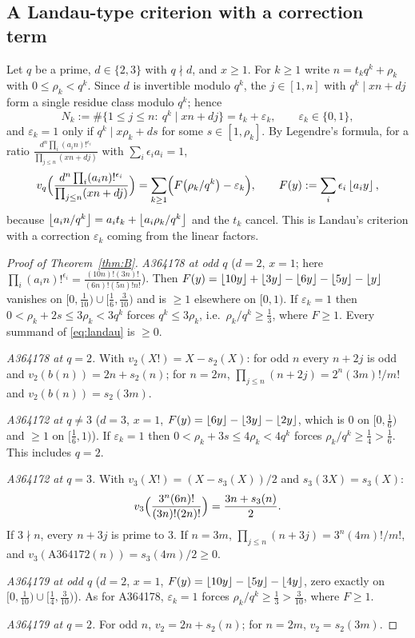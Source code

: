\documentclass[11pt]{amsart}
\begin{document}
\subsection{A Landau-type criterion with a correction term}
Let $q$ be a prime, $d\in\{2,3\}$ with $q\nmid d$, and $x\ge1$. For $k\ge1$ write $n=t_kq^k+\rho_k$ with $0\le\rho_k<q^k$. Since $d$ is invertible modulo $q^k$, the $j\in[1,n]$ with $q^k\mid xn+dj$ form a single residue class modulo $q^k$; hence
\[ N_k:=\#\{1\le j\le n:\ q^k\mid xn+dj\}=t_k+\varepsilon_k,\qquad \varepsilon_k\in\{0,1\}, \]
and $\varepsilon_k=1$ only if $q^k\mid x\rho_k+ds$ for some $s\in[1,\rho_k]$. By Legendre's formula, for a ratio $\frac{d^n\prod_i(a_in)!^{\epsilon_i}}{\prod_{j\le n}(xn+dj)}$ with $\sum_i\epsilon_ia_i=1$,
\begin{equation}\label{eq:landau}
v_q\Bigl(\frac{d^n\prod_i(a_in)!^{\epsilon_i}}{\prod_{j\le n}(xn+dj)}\Bigr)=\sum_{k\ge1}\Bigl(F\bigl(\rho_k/q^k\bigr)-\varepsilon_k\Bigr),\qquad F(y):=\sum_i\epsilon_i\left\lfloor a_iy\right\rfloor,
\end{equation}
because $\left\lfloor a_in/q^k\right\rfloor=a_it_k+\left\lfloor a_i\rho_k/q^k\right\rfloor$ and the $t_k$ cancel. This is Landau's criterion \cite{landau1900} with a correction $\varepsilon_k$ coming from the linear factors.

\begin{proof}[Proof of Theorem~\ref{thm:B}]
\emph{A364178 at odd $q$} ($d=2$, $x=1$; here $\prod_i(a_in)!^{\epsilon_i}=\frac{(10n)!(3n)!}{(6n)!(5n)!n!}$). Then $F(y)=\left\lfloor 10y\right\rfloor+\left\lfloor 3y\right\rfloor-\left\lfloor 6y\right\rfloor-\left\lfloor 5y\right\rfloor-\left\lfloor y\right\rfloor$ vanishes on $[0,\frac1{10})\cup[\frac16,\frac3{10})$ and is $\ge1$ elsewhere on $[0,1)$. If $\varepsilon_k=1$ then $0<\rho_k+2s\le3\rho_k<3q^k$ forces $q^k\le3\rho_k$, i.e.\ $\rho_k/q^k\ge\frac13$, where $F\ge1$. Every summand of \eqref{eq:landau} is $\ge0$.

\emph{A364178 at $q=2$.} With $v_2(X!)=X-s_2(X)$: for odd $n$ every $n+2j$ is odd and $v_2(b(n))=2n+s_2(n)$; for $n=2m$, $\prod_{j\le n}(n+2j)=2^n(3m)!/m!$ and $v_2(b(n))=s_2(3m)$.

\emph{A364172 at $q\ne3$} ($d=3$, $x=1$, $F(y)=\left\lfloor 6y\right\rfloor-\left\lfloor 3y\right\rfloor-\left\lfloor 2y\right\rfloor$, which is $0$ on $[0,\frac16)$ and $\ge1$ on $[\frac16,1)$). If $\varepsilon_k=1$ then $0<\rho_k+3s\le4\rho_k<4q^k$ forces $\rho_k/q^k\ge\frac14>\frac16$. This includes $q=2$.

\emph{A364172 at $q=3$.} With $v_3(X!)=(X-s_3(X))/2$ and $s_3(3X)=s_3(X)$: \[ v_3\Bigl(\frac{3^n(6n)!}{(3n)!(2n)!}\Bigr)=\frac{3n+s_3(n)}2. \] If $3\nmid n$, every $n+3j$ is prime to $3$. If $n=3m$, $\prod_{j\le n}(n+3j)=3^n(4m)!/m!$, and $v_3(\text{A364172}(n))=s_3(4m)/2\ge0$.

\emph{A364179 at odd $q$} ($d=2$, $x=1$, $F(y)=\left\lfloor 10y\right\rfloor-\left\lfloor 5y\right\rfloor-\left\lfloor 4y\right\rfloor$, zero exactly on $[0,\frac1{10})\cup[\frac14,\frac3{10})$). As for A364178, $\varepsilon_k=1$ forces $\rho_k/q^k\ge\frac13>\frac3{10}$, where $F\ge1$.

\emph{A364179 at $q=2$.} For odd $n$, $v_2=2n+s_2(n)$; for $n=2m$, $v_2=s_2(3m)$.
\end{proof}
\end{document}
